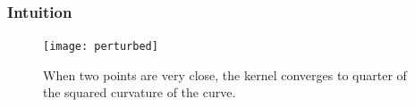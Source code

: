 \documentclass{beamer}
\theoremstyle{remark}
\newcommand{\gammabf}{\boldsymbol{\gamma}}
\begin{document}
\begin{frame}
    \frametitle{Intuition}
    \begin{figure}[h]
        \centering
        \texttt{[image: perturbed]}
        \caption{When two points are very close, the kernel converges to quarter of the squared curvature of the curve.}
    \end{figure}
\end{frame}

%
\end{document}
